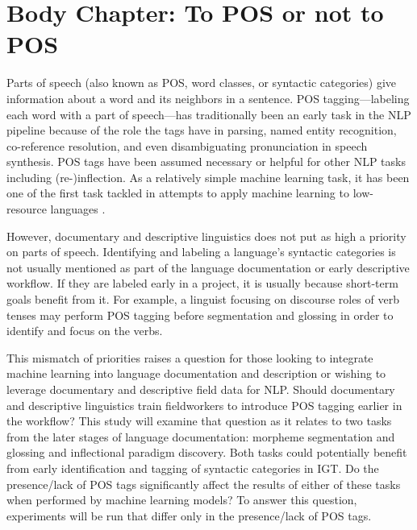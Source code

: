 \section{Body Chapter: To POS or not to POS}
\label{sec:POS}

Parts of speech (also known as POS, word classes, or syntactic categories) give information about a word and its neighbors in a sentence. POS tagging---labeling each word with a part of speech---has traditionally been an early task in the NLP pipeline because of the role the tags have in parsing, named entity recognition, co-reference resolution, and even disambiguating pronunciation in speech synthesis. POS tags have been assumed necessary or helpful for other NLP tasks including (re-)inflection. As a relatively simple machine learning task, it has been one of the first task tackled in attempts to apply machine learning to low-resource languages \citep{cox_probabilistic_2010,de_pauw_resource-light_2012,baldridge_learning_2013,duong_natural_2017,anastasopoulos_computational_2019,millour_unsupervised_2019}. 

However, documentary and descriptive linguistics does not put as high a priority on parts of speech. Identifying and labeling a  language's syntactic categories is not usually mentioned as part of the language documentation or early descriptive workflow. 
If they are labeled early in a project, it is usually because short-term goals benefit from it. For example, a linguist focusing on discourse roles of verb tenses may perform POS tagging before segmentation and glossing in order to identify and focus on the verbs. 

This mismatch of priorities raises a question for those looking to integrate machine learning into language documentation and description or wishing to leverage documentary and descriptive field data for NLP. Should documentary and descriptive linguistics train fieldworkers to introduce POS tagging earlier in the workflow? 
This study will examine that question as it relates to two tasks from the later stages of language documentation: morpheme segmentation and glossing and inflectional paradigm discovery. Both tasks could potentially benefit from early identification and tagging of syntactic categories in IGT. Do the presence/lack of POS tags significantly affect the results of either of these tasks when performed by machine learning models? To answer this question, experiments will be run that differ only in the presence/lack of POS tags.


